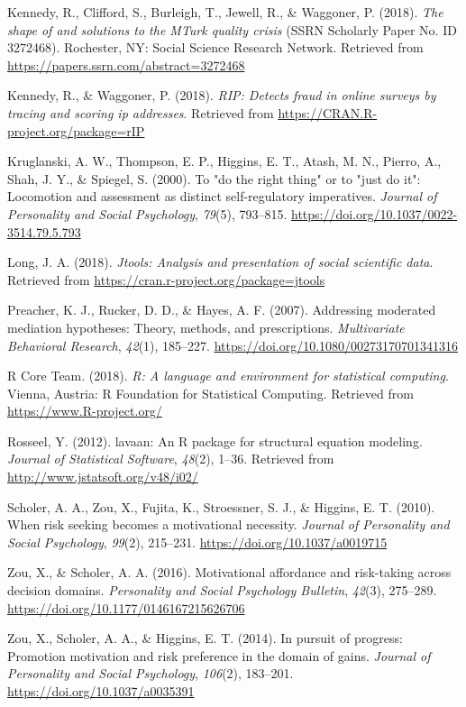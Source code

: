 \documentclass[man,floatsintext]{apa6}
\begin{document}
\leavevmode\hypertarget{ref-kennedyetal2018}{}%
Kennedy, R., Clifford, S., Burleigh, T., Jewell, R., \& Waggoner, P. (2018). \emph{The shape of and solutions to the MTurk quality crisis} (SSRN Scholarly Paper No. ID 3272468). Rochester, NY: Social Science Research Network. Retrieved from \url{https://papers.ssrn.com/abstract=3272468}

\leavevmode\hypertarget{ref-R-rIP}{}%
Kennedy, R., \& Waggoner, P. (2018). \emph{RIP: Detects fraud in online surveys by tracing and scoring ip addresses}. Retrieved from \url{https://CRAN.R-project.org/package=rIP}

\leavevmode\hypertarget{ref-kruglanskietal2000}{}%
Kruglanski, A. W., Thompson, E. P., Higgins, E. T., Atash, M. N., Pierro, A., Shah, J. Y., \& Spiegel, S. (2000). To "do the right thing" or to "just do it": Locomotion and assessment as distinct self-regulatory imperatives. \emph{Journal of Personality and Social Psychology}, \emph{79}(5), 793--815. \url{https://doi.org/10.1037/0022-3514.79.5.793}

\leavevmode\hypertarget{ref-R-jtools}{}%
Long, J. A. (2018). \emph{Jtools: Analysis and presentation of social scientific data}. Retrieved from \url{https://cran.r-project.org/package=jtools}

\leavevmode\hypertarget{ref-preacheretal2007}{}%
Preacher, K. J., Rucker, D. D., \& Hayes, A. F. (2007). Addressing moderated mediation hypotheses: Theory, methods, and prescriptions. \emph{Multivariate Behavioral Research}, \emph{42}(1), 185--227. \url{https://doi.org/10.1080/00273170701341316}

\leavevmode\hypertarget{ref-R-base}{}%
R Core Team. (2018). \emph{R: A language and environment for statistical computing}. Vienna, Austria: R Foundation for Statistical Computing. Retrieved from \url{https://www.R-project.org/}

\leavevmode\hypertarget{ref-R-lavaan}{}%
Rosseel, Y. (2012). lavaan: An R package for structural equation modeling. \emph{Journal of Statistical Software}, \emph{48}(2), 1--36. Retrieved from \url{http://www.jstatsoft.org/v48/i02/}

\leavevmode\hypertarget{ref-scholeretal2010}{}%
Scholer, A. A., Zou, X., Fujita, K., Stroessner, S. J., \& Higgins, E. T. (2010). When risk seeking becomes a motivational necessity. \emph{Journal of Personality and Social Psychology}, \emph{99}(2), 215--231. \url{https://doi.org/10.1037/a0019715}

\leavevmode\hypertarget{ref-zouscholer2016}{}%
Zou, X., \& Scholer, A. A. (2016). Motivational affordance and risk-taking across decision domains. \emph{Personality and Social Psychology Bulletin}, \emph{42}(3), 275--289. \url{https://doi.org/10.1177/0146167215626706}

\leavevmode\hypertarget{ref-zouetal2014}{}%
Zou, X., Scholer, A. A., \& Higgins, E. T. (2014). In pursuit of progress: Promotion motivation and risk preference in the domain of gains. \emph{Journal of Personality and Social Psychology}, \emph{106}(2), 183--201. \url{https://doi.org/10.1037/a0035391}

\endgroup
\end{document}

